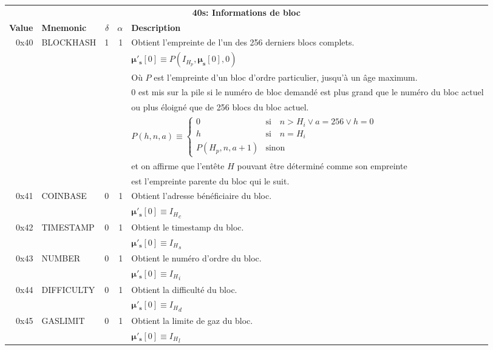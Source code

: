 \documentclass[9pt,oneside]{amsart}
\begin{document}
\begin{tabular*}{\columnwidth}[h]{rlrrl}
\toprule
\multicolumn{5}{c}{\textbf{40s: Informations de bloc}} \vspace{5pt} \\
\textbf{Value} & \textbf{Mnemonic} & $\delta$ & $\alpha$ & \textbf{Description} \vspace{5pt} \\
0x40 & {\small BLOCKHASH} & 1 & 1 & Obtient l'empreinte de l'un des 256 derniers blocs complets. \\
&&&& $\boldsymbol{\mu}'_\mathbf{s}[0] \equiv P(I_{H_p}, \boldsymbol{\mu}_\mathbf{s}[0], 0)$ \\
&&&& Où $P$ est l'empreinte d'un bloc d'ordre particulier, jusqu'à un âge maximum.\\
&&&& 0 est mis sur la pile si le numéro de bloc demandé est plus grand que le numéro du bloc actuel \\
&&&& ou plus éloigné que de 256 blocs du bloc actuel. \\
&&&& $P(h, n, a) \equiv \begin{cases} 0 & \text{si} \quad n > H_i \vee a = 256 \vee h = 0 \\ h & \text{si} \quad n = H_i \\ P(H_p, n, a + 1) & \text{sinon} \end{cases}$ \\
&&&& et on affirme que l'entête $H$ pouvant être déterminé comme son empreinte \\
&&&& est l'empreinte parente du bloc qui le suit. \\
\midrule
0x41 & {\small COINBASE} & 0 & 1 & Obtient l'adresse bénéficiaire du bloc. \\
&&&& $\boldsymbol{\mu}'_\mathbf{s}[0] \equiv {I_H}_c$ \\
\midrule
0x42 & {\small TIMESTAMP} & 0 & 1 & Obtient le timestamp du bloc. \\
&&&& $\boldsymbol{\mu}'_\mathbf{s}[0] \equiv {I_H}_s$ \\
\midrule
0x43 & {\small NUMBER} & 0 & 1 & Obtient le numéro d'ordre du bloc. \\
&&&& $\boldsymbol{\mu}'_\mathbf{s}[0] \equiv {I_H}_i$ \\
\midrule
0x44 & {\small DIFFICULTY} & 0 & 1 & Obtient la difficulté du bloc. \\
&&&& $\boldsymbol{\mu}'_\mathbf{s}[0] \equiv {I_H}_d$ \\
\midrule
0x45 & {\small GASLIMIT} & 0 & 1 & Obtient la limite de gaz du bloc. \\
&&&& $\boldsymbol{\mu}'_\mathbf{s}[0] \equiv {I_H}_l$ \\
\bottomrule
\end{tabular*}
\end{document}

